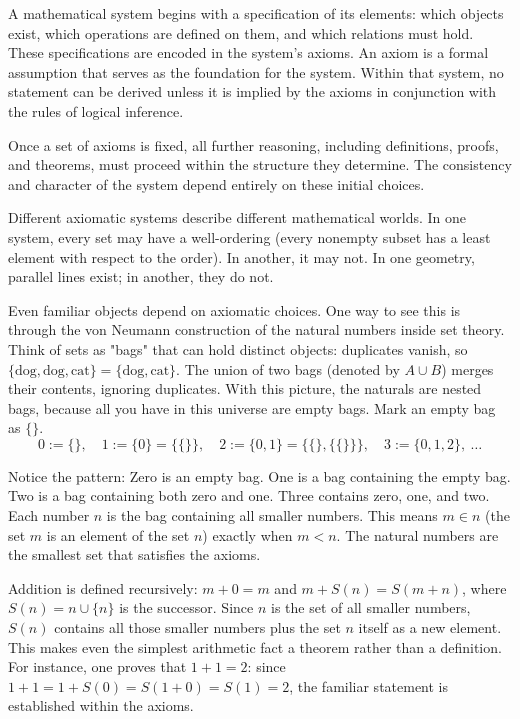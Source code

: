 A mathematical system begins with a specification of its elements: which objects exist, which operations are defined on them, and which relations must hold. These specifications are encoded in the system's axioms. An axiom is a formal assumption that serves as the foundation for the system. Within that system, no statement can be derived unless it is implied by the axioms in conjunction with the rules of logical inference.

Once a set of axioms is fixed, all further reasoning, including definitions, proofs, and theorems, must proceed within the structure they determine. The consistency and character of the system depend entirely on these initial choices.

Different axiomatic systems describe different mathematical worlds. In one system, every set may have a well-ordering (every nonempty subset has a least element with respect to the order). In another, it may not. In one geometry, parallel lines exist; in another, they do not.

Even familiar objects depend on axiomatic choices. One way to see this is through the von Neumann construction of the natural numbers inside set theory. Think of sets as "bags" that can hold distinct objects: duplicates vanish, so $\{\text{dog},\text{dog},\text{cat}\}=\{\text{dog},\text{cat}\}$. The union of two bags (denoted by $A \cup B$) merges their contents, ignoring duplicates. With this picture, the naturals are nested bags, because all you have in this universe are empty bags. Mark an empty bag as $\{ \}$. 
\[
0:=\{\}, \quad 1:=\{0\}=\{\{\}\}, \quad 2:=\{0,1\}=\{\{\},\{\{\}\}\}, \quad 3:=\{0,1,2\}, \ \dots
\]

Notice the pattern: Zero is an empty bag. One is a bag containing the empty bag. Two is a bag containing both zero and one. Three contains zero, one, and two. Each number $n$ is the bag containing all smaller numbers. This means $m\in n$ (the set $m$ is an element of the set $n$) exactly when $m<n$. The natural numbers are the smallest set that satisfies the axioms.

Addition is defined recursively: $m+0=m$ and $m+S(n)=S(m+n)$, where $S(n)=n\cup\{n\}$ is the successor. Since $n$ is the set of all smaller numbers, $S(n)$ contains all those smaller numbers plus the set $n$ itself as a new element. This makes even the simplest arithmetic fact a theorem rather than a definition. For instance, one proves that $1+1=2$: since $1+1=1+S(0)=S(1+0)=S(1)=2$, the familiar statement is established within the axioms.

